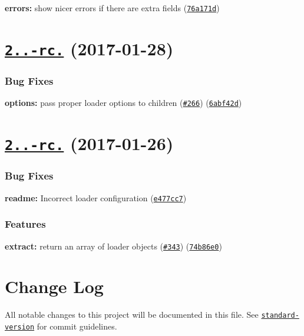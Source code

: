 \begin{DoxyItemize}
\item {\bfseries errors\+:} show nicer errors if there are extra fields (\href{https://github.com/webpack/extract-text-webpack-plugin/commit/76a171d}{\tt 76a171d})
\end{DoxyItemize}

\label{_2.0.0-rc.1}%
 \section*{\href{https://github.com/webpack/extract-text-webpack-plugin/compare/v2.0.0-rc.0...v2.0.0-rc.1}{\tt 2..-\/rc.} (2017-\/01-\/28)}

\subsubsection*{Bug Fixes}


\begin{DoxyItemize}
\item {\bfseries options\+:} pass proper loader options to children (\href{https://github.com/webpack/extract-text-webpack-plugin/issues/266}{\tt \#266}) (\href{https://github.com/webpack/extract-text-webpack-plugin/commit/6abf42d}{\tt 6abf42d})
\end{DoxyItemize}

\label{_2.0.0-rc.0}%
 \section*{\href{https://github.com/webpack/extract-text-webpack-plugin/compare/v2.0.0-beta.5...v2.0.0-rc.0}{\tt 2..-\/rc.} (2017-\/01-\/26)}

\subsubsection*{Bug Fixes}


\begin{DoxyItemize}
\item {\bfseries readme\+:} Incorrect loader configuration (\href{https://github.com/webpack/extract-text-webpack-plugin/commit/e477cc7}{\tt e477cc7})
\end{DoxyItemize}

\subsubsection*{Features}


\begin{DoxyItemize}
\item {\bfseries extract\+:} return an array of loader objects (\href{https://github.com/webpack/extract-text-webpack-plugin/issues/343}{\tt \#343}) (\href{https://github.com/webpack/extract-text-webpack-plugin/commit/74b86e0}{\tt 74b86e0})
\end{DoxyItemize}

\section*{Change Log}

All notable changes to this project will be documented in this file. See \href{https://github.com/conventional-changelog/standard-version}{\tt standard-\/version} for commit guidelines. 